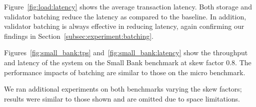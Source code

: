 Figure~\ref{fig:load:latency} shows the average transaction latency. Both storage and validator batching reduce the latency as compared to the baseline. In addition, validator batching is always effective in reducing latency, again confirming our findings in Section~\ref{subsec:experiment:batching}.

Figures~\ref{fig:small_bank:tps} and~\ref{fig:small_bank:latency} show the throughput and latency of the system on the Small Bank benchmark at skew factor 0.8. The performance impacts of batching are similar to those on the micro benchmark.

We ran additional experiments on both benchmarks varying the skew factors; results were similar to those shown and are omitted due to space limitations.
